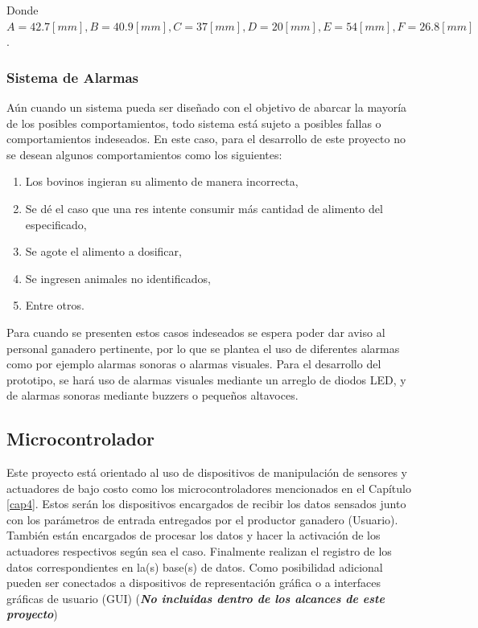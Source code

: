 Donde $A=42.7[mm], B=40.9[mm], C=37[mm], D=20[mm], E=54[mm], F=26.8[mm]$.

\subsubsection{Sistema de Alarmas}

Aún cuando un sistema pueda ser diseñado con el objetivo de abarcar la mayoría de los posibles comportamientos, todo sistema está sujeto a posibles fallas o comportamientos indeseados. En este caso, para el desarrollo de este proyecto no se desean algunos comportamientos como los siguientes:

\begin{enumerate}
    \item Los bovinos ingieran su alimento de manera incorrecta,
    \item Se dé el caso que una res intente consumir más cantidad de alimento del especificado,
    \item Se agote el alimento a dosificar,
    \item Se ingresen animales no identificados,
    \item Entre otros.
\end{enumerate}

Para cuando se presenten estos casos indeseados se espera poder dar aviso al personal ganadero pertinente, por lo que se plantea el uso de diferentes alarmas como por ejemplo alarmas sonoras o alarmas visuales. Para el desarrollo del prototipo, se hará uso de alarmas visuales mediante un arreglo de diodos LED, y de alarmas sonoras mediante buzzers o pequeños altavoces.

\subsection{Microcontrolador}

Este proyecto está orientado al uso de dispositivos de manipulación de sensores y actuadores de bajo costo como los microcontroladores mencionados en el Capítulo \ref{cap4}. Estos serán los dispositivos encargados de recibir los datos sensados junto con los parámetros de entrada entregados por el productor ganadero (Usuario). También están encargados de procesar los datos y hacer la activación de los actuadores respectivos según sea el caso. Finalmente realizan el registro de los datos correspondientes en la(s) base(s) de datos. Como posibilidad adicional pueden ser conectados a dispositivos de representación gráfica o a interfaces gráficas de usuario (GUI) (\textit{\textbf{No incluidas dentro de los alcances de este proyecto}})

